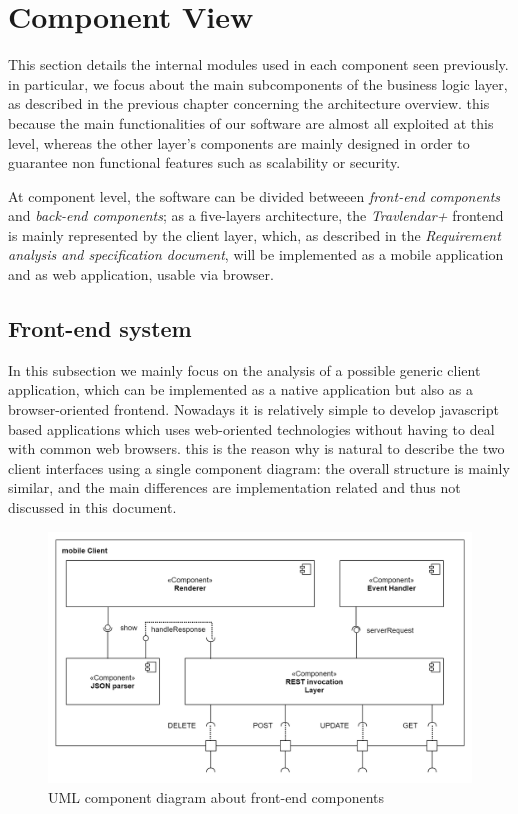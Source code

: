 \section{Component View}


This section details the internal modules used in each component seen previously.
in particular, we focus about the main subcomponents of the business logic layer, as described in the previous chapter concerning the architecture overview. 
this because the main functionalities  of our software are almost all exploited at this level, whereas the other layer's components are mainly
designed in order to guarantee non functional features such as scalability or security. 

At component level, the software can be divided betweeen \emph{front-end components} and \emph{back-end components}; as a five-layers architecture, the \emph{Travlendar+} frontend is mainly represented by the client layer, which, as described in the \emph{Requirement analysis and specification document}, will be implemented as a mobile application and as web application, usable via browser.
\subsection{Front-end system}
In this subsection we mainly focus on the analysis of a possible generic client application, which can be implemented as a native application but also as a browser-oriented frontend.
Nowadays it is relatively simple to develop javascript based applications which uses web-oriented technologies without having to deal with common web browsers. this is the reason why is
natural to describe the two client interfaces using a single component diagram: the overall structure is mainly similar, and the main differences are implementation related and thus not
discussed in this document.
\begin{figure}[H]
    \centering
    \includegraphics[scale=0.2]{Pictures/ComponentDiagram/client_component.png}
    \caption{UML component diagram about front-end components}
    \label{component:client}
\end{figure}

